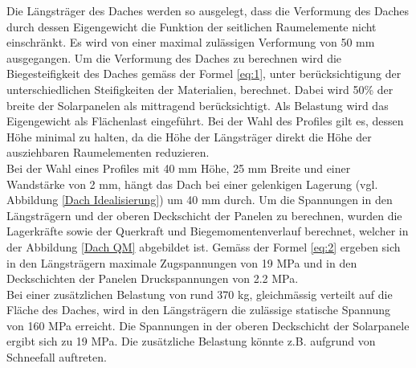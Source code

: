 Die Längsträger des Daches werden so ausgelegt, dass die Verformung des Daches durch dessen Eigengewicht die Funktion der seitlichen Raumelemente nicht einschränkt. Es wird von einer maximal zulässigen Verformung von 50 mm ausgegangen. Um die Verformung des Daches zu berechnen wird die Biegesteifigkeit des Daches gemäss der Formel \ref{eq:1}, unter berücksichtigung der unterschiedlichen Steifigkeiten der Materialien, berechnet. Dabei wird 50\% der breite der Solarpanelen als mittragend berücksichtigt. Als Belastung wird das Eigengewicht als Flächenlast eingeführt. Bei der Wahl des Profiles gilt es, dessen Höhe minimal zu halten, da die Höhe der Längsträger direkt die Höhe der ausziehbaren Raumelementen reduzieren.\\
Bei der Wahl eines Profiles mit 40 mm Höhe, 25 mm Breite und einer Wandstärke von 2 mm, hängt das Dach bei einer gelenkigen Lagerung (vgl. Abbildung \ref{Dach Idealisierung}) um 40 mm durch. Um die Spannungen in den Längsträgern und der oberen Deckschicht der Panelen zu berechnen, wurden die Lagerkräfte sowie der Querkraft und Biegemomentenverlauf berechnet, welcher in der Abbildung \ref{Dach QM} abgebildet ist. Gemäss der Formel \ref{eq:2} ergeben sich in den Längsträgern maximale Zugspannungen von 19 MPa und in den Deckschichten der Panelen Druckspannungen von 2.2 MPa.\\
Bei einer zusätzlichen Belastung von rund 370 kg, gleichmässig verteilt auf die Fläche des Daches, wird in den Längsträgern die zulässige statische Spannung von 160 MPa erreicht. Die Spannungen in der oberen Deckschicht der Solarpanele ergibt sich zu 19 MPa. Die zusätzliche Belastung könnte z.B. aufgrund von Schneefall auftreten.

